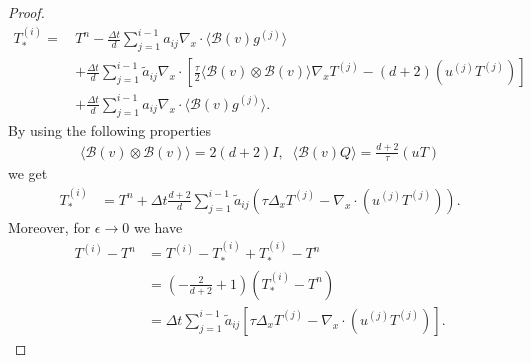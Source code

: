 \documentclass[10pt,a4paper]{amsart}
\begin{document}
\begin{proof}
\begin{equation}
\label{eq:T_star_stage}
\begin{split}
T_*^{(i)} = \, & T^n - \frac{\Delta t}{d} \sum_{j = 1}^{i-1} a_{ij} \nabla_x \cdot \langle \mathcal{B}(v) g^{(j)} \rangle \\
& + \frac{\Delta t}{d} \sum_{j=1}^{i-1} \tilde{a}_{ij} \nabla_x \cdot \left[ \frac{\tau}{2} \langle \mathcal{B}(v) \otimes \mathcal{B}(v) \rangle \nabla_x T^{(j)} - (d+2)(u^{(j)}T^{(j)}) \right] \\
& + \frac{\Delta t}{d} \sum_{j = 1}^{i-1} a_{ij} \nabla_x \cdot \langle \mathcal{B}(v) g^{(j)} \rangle.
\end{split}
\end{equation}
By using the following properties 
\begin{equation}
\begin{split}
\langle \mathcal{B}(v) \otimes \mathcal{B}(v) \rangle = 2(d+2)I , \;\; 
\langle \mathcal{B}(v) Q \rangle = \frac{d+2}{\tau} (uT)
\end{split}
\end{equation}
we get
\begin{equation}\begin{split} 
T_*^{(i)} &= T^n + \Delta t \frac{d+2}{d} \sum_{j=1}^{i-1} \tilde{a}_{ij} \left( \tau \Delta_x T^{(j)} - \nabla_x \cdot (u^{(j)}T^{(j)}) \right).
\end{split}
\end{equation}
Moreover, 
for $\epsilon \rightarrow 0$ we have 
\begin{align*}
T^{(i)} - T^n &= T^{(i)} - T_*^{(i)} + T_*^{(i)} - T^n \\
&= \left( -\frac{2}{d+2} + 1 \right) (T_*^{(i)} - T^n) \\
&= \Delta t \sum_{j=1}^{i-1} \tilde{a}_{ij} \left[ \tau \Delta_x T^{(j)} - \nabla_x \cdot (u^{(j)} T^{(j)}) \right].
\end{align*}


\end{proof}
\end{document}
